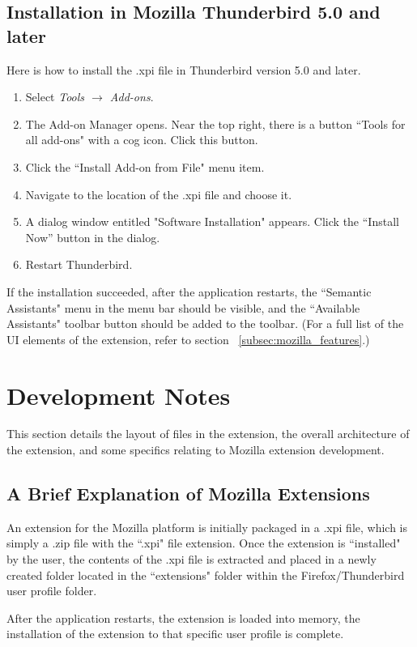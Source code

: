 \subsection{Installation in Mozilla Thunderbird 5.0 and later}
Here is how to install the .xpi file in Thunderbird version 5.0 and later. 
\begin{enumerate}
  \item Select \emph{Tools $\rightarrow$ Add-ons}.
  \item The Add-on Manager opens. Near the top right, there is a button ``Tools for all add-ons" with a cog icon. Click this button.
  \item Click the ``Install Add-on from File" menu item.
  \item Navigate to the location of the .xpi file and choose it.
  \item A dialog window entitled "Software Installation" appears. Click the ``Install Now'' button in the dialog.
  \item Restart Thunderbird.
\end{enumerate}

If the installation succeeded, after the application restarts, the ``Semantic Assistants" menu in the menu bar should be visible, and the ``Available Assistants" toolbar button should be added to the toolbar. (For a full list of the UI elements of the extension, refer to section ~\ref{subsec:mozilla_features}.)

\section{Development Notes}
\label{subsec:mozilla_development}
This section details the layout of files in the extension, the overall architecture of the extension, and some specifics relating to Mozilla extension development. 

\subsection{A Brief Explanation of Mozilla Extensions}
An extension for the Mozilla platform is initially packaged in a .xpi file, which is simply a .zip file with the ``.xpi" file extension. Once the extension is ``installed" by the user, the contents of the .xpi file is extracted and placed in a newly created folder located in the ``extensions" folder within the Firefox/Thunderbird user profile folder. 

After the application restarts, the extension is loaded into memory, the installation of the extension to that specific user profile is complete.  

